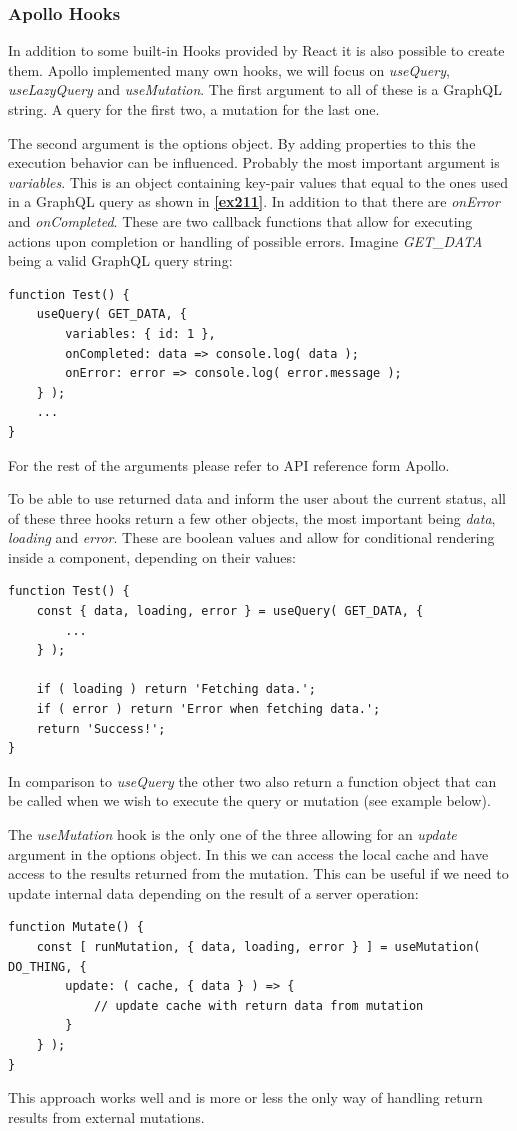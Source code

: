 \subsubsection{Apollo Hooks}
In addition to some built-in Hooks provided by React it is also possible to create them. Apollo implemented many own hooks, we will focus on \emph{useQuery}, \emph{useLazyQuery} and \emph{useMutation}.
The first argument to all of these is a GraphQL string. A query for the first two, a mutation for the last one.

The second argument is the options object. By adding properties to this the execution behavior can be influenced. Probably the most important argument is \emph{variables}. This is an object containing key-pair values that equal to the ones used in a GraphQL query as shown in \textbf{\ref{ex211}}. In addition to that there are \emph{onError} and \emph{onCompleted}. These are two callback functions that allow for executing actions upon completion or handling of possible errors. Imagine \emph{GET\_DATA} being a valid GraphQL query string:
\begin{lstlisting}
function Test() {
	useQuery( GET_DATA, {
		variables: { id: 1 },
		onCompleted: data => console.log( data );
		onError: error => console.log( error.message );
	} );
	...
}
\end{lstlisting}

For the rest of the arguments please refer to API reference form Apollo.

To be able to use returned data and inform the user about the current status, all of these three hooks return a few other objects, the most important being \emph{data}, \emph{loading} and \emph{error}. These are boolean values and allow for conditional rendering inside a component, depending on their values: 
\begin{lstlisting}
function Test() {
	const { data, loading, error } = useQuery( GET_DATA, {
		...	
	} );
	
	if ( loading ) return 'Fetching data.';
	if ( error ) return 'Error when fetching data.';
	return 'Success!';
}
\end{lstlisting}

In comparison to \emph{useQuery} the other two also return a function object that can be called when we wish to execute the query or mutation (see example below).

The \emph{useMutation} hook is the only one of the three allowing for an \emph{update} argument in the options object. In this we can access the local cache and have access to the results returned from the mutation. This can be useful if we need to update internal data depending on the result of a server operation:
\begin{lstlisting}[caption={Creating a Mutation},label={ex:usingMutation}]
function Mutate() {
	const [ runMutation, { data, loading, error } ] = useMutation( DO_THING, {
		update: ( cache, { data } ) => {
			// update cache with return data from mutation
		}	
	} );
}
\end{lstlisting}
This approach works well and is more or less the only way of handling return results from external mutations. 

